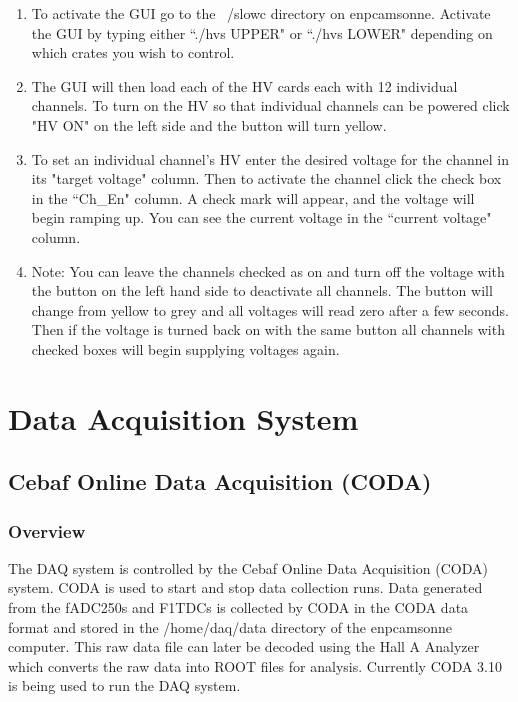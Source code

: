 \documentclass[oneside]{book}   %
\begin{document}
\begin{enumerate}
	\item To activate the GUI go to the ~/slowc directory on enpcamsonne. Activate the GUI by typing either ``./hvs UPPER" or ``./hvs LOWER" depending on which crates you wish to control.
	\item The GUI will then load each of the HV cards each with 12 individual channels. To turn on the HV so that individual channels can be powered click "HV ON" on the left side and the button will turn yellow.
	\item To set an individual channel's HV enter the desired voltage for the channel in its "target voltage" column. Then to activate the channel click the check box in the ``Ch\_En" column. A check mark will appear, and the voltage will begin ramping up. You can see the current voltage in the ``current voltage" column.
	\item Note: You can leave the channels checked as on and turn off the voltage with the button on the left hand side to deactivate all channels. The button will change from yellow to grey and all voltages will read zero after a few seconds. Then if the voltage is turned back on with the same button all channels with checked boxes will begin supplying voltages again. 
\end{enumerate}


\chapter{Data Acquisition System}
\label{ch:daq}

\section{Cebaf Online Data Acquisition (CODA)}
\label{sec:coda}

\subsection{Overview}
\label{ssec:coda_overview}

The DAQ system is controlled by the Cebaf Online Data Acquisition (CODA) system. CODA is used to start and stop data collection runs. Data generated from the fADC250s and F1TDCs is collected by CODA in the CODA data format and stored in the /home/daq/data directory of the enpcamsonne computer. This raw data file can later be decoded using the Hall A Analyzer which converts the raw data into ROOT files for analysis. Currently CODA 3.10 is being used to run the DAQ system.
\end{document}
